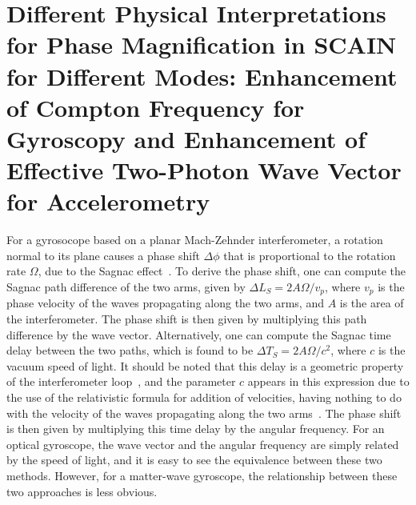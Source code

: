 \documentclass[aps,pra,letterpaper,superscriptaddress,showpacs,amsmath,floats,twocolumn]{revtex4-1}
\begin{document}



\appendix

\section{Different Physical Interpretations for Phase Magnification in SCAIN for Different Modes:  Enhancement of Compton Frequency for Gyroscopy and Enhancement of Effective Two-Photon Wave Vector for Accelerometry}
For a gyrosocope based on a planar Mach-Zehnder interferometer, a rotation normal to its plane causes a phase shift $\Delta\phi$ that is proportional to the rotation rate $\Omega$, due to the Sagnac effect~\cite{Malykin,Sagnac}. To derive the phase shift, one can compute the Sagnac path difference of the two arms, given by $\Delta L_{S}=2A\Omega/v_p$, where $v_p$ is the phase velocity of the waves propagating along the two arms, and $A$ is the area of the interferometer. The phase shift is then given by multiplying this path difference by the wave vector. Alternatively, one can compute the Sagnac time delay between the two paths, which is found to be $\Delta T_{S}=2A\Omega/c^2$, where $c$ is the vacuum speed of light. It should be noted that this delay is a geometric property of the interferometer loop~\cite{Comment2}, and the parameter $c$ appears in this expression due to the use of the relativistic formula for addition of velocities, having nothing to do with the velocity of the waves propagating along the two arms~\cite{Malykin}. The phase shift is then given by multiplying this time delay by the angular frequency.  For an optical gyroscope, the wave vector and the angular frequency are simply related by the speed of light, and it is easy to see the equivalence between these two methods. However, for a matter-wave gyroscope, the relationship between these two approaches is less obvious. 
\end{document}
